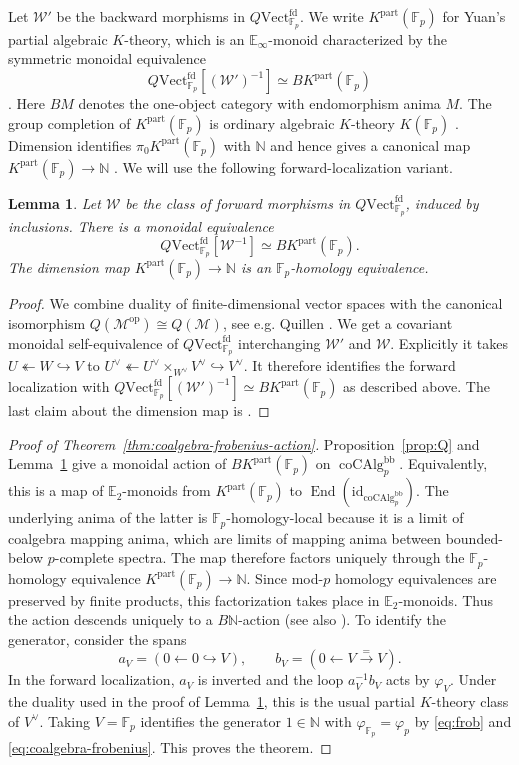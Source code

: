 \documentclass[11pt,a4paper]{article}
\newtheorem{lemma}[thm]{Lemma}
\theoremstyle{definition}
\newcommand{\Fp}{\mathbb F_p}
\newcommand{\op}{\mathrm{op}}
\newcommand{\coAlg}{\operatorname{coCAlg}}
\newcommand{\End}{\operatorname{End}}
\newcommand{\id}{\mathrm{id}}
\newcommand{\Vect}{\mathrm{Vect}^{\mathrm{fd}}_{\Fp}}
\newcommand{\Kpart}{K^{\mathrm{part}}}
\begin{document}
Let $\mathcal W'$ be the backward morphisms in $Q\Vect$.
We write $\Kpart(\Fp)$ for Yuan's partial algebraic
$K$-theory, which is an $\mathbb{E}_\infty$-monoid characterized by the symmetric monoidal equivalence
\[
 Q\Vect[(\mathcal W')^{-1}]\simeq B\Kpart(\Fp)
\]
\cite[Theorem~4.14 and Corollary~4.23.1]{Yuan}.
Here $BM$ denotes the one-object category with endomorphism
anima $M$.
The group completion of $\Kpart(\Fp)$ is ordinary algebraic $K$-theory
$K(\Fp)$ \cite[Corollary~4.9.2]{Yuan}.
Dimension identifies $\pi_0\Kpart(\Fp)$ with $\mathbb N$ and hence
gives a canonical map $\Kpart(\Fp)\to\mathbb N$
\cite[Proposition~4.10]{Yuan}.
We will use the following forward-localization variant.

\begin{lemma}\label{lem:forward-localization}
Let $\mathcal W$ be the class of forward morphisms in $Q\Vect$, induced by inclusions. There is a
monoidal equivalence
\[
 Q\Vect[\mathcal W^{-1}]\simeq B\Kpart(\Fp).
\]
The dimension map $\Kpart(\Fp)\to\mathbb N$ is an
$\Fp$-homology equivalence.
\end{lemma}
\begin{proof}
We combine
duality of finite-dimensional vector spaces with
the canonical isomorphism $Q(\mathcal M^{\op})\cong Q(\mathcal M)$, see e.g. Quillen
\cite[\S2, equation~(5)]{Quillen}. We get 
a covariant monoidal self-equivalence of $Q\Vect$
interchanging $\mathcal W'$ and $\mathcal W$.
Explicitly it takes
$U\twoheadleftarrow W\hookrightarrow V$ to
$U^\vee\twoheadleftarrow U^\vee\times_{W^\vee}V^\vee\hookrightarrow V^\vee$.
It therefore identifies the forward localization with
$Q\Vect[(\mathcal W')^{-1}] \simeq B\Kpart(\Fp)$ as described above.
The last claim about the dimension map is \cite[Theorem~5.2]{Yuan}.
\end{proof}

\begin{proof}[Proof of Theorem~\ref{thm:coalgebra-frobenius-action}]
Proposition~\ref{prop:Q} and Lemma~\ref{lem:forward-localization}
give a monoidal action of $B\Kpart(\Fp)$ on $\coAlg_p^{\mathrm{bb}}$.
Equivalently, this is a map of $\mathbb{E}_2$-monoids from
$\Kpart(\Fp)$ to $\End(\id_{\coAlg_p^{\mathrm{bb}}})$.
The underlying anima of the latter is $\Fp$-homology-local because
it is a limit of coalgebra mapping anima, which are limits of
mapping anima between bounded-below $p$-complete spectra.
The map therefore factors uniquely through the $\Fp$-homology
equivalence $\Kpart(\Fp)\to\mathbb N$.
Since mod-$p$ homology equivalences are preserved by finite products,
this factorization takes place in $\mathbb{E}_2$-monoids.
Thus the action descends uniquely to a $B\mathbb N$-action
(see also \cite[\S6.2]{Yuan}). 
To identify the generator, consider the spans
\[
 a_V=(0\leftarrow0\hookrightarrow V),\qquad
 b_V=(0\leftarrow V\xrightarrow{=}V).
\]
In the forward localization, $a_V$ is inverted and the loop
$a_V^{-1}b_V$ acts by $\varphi_V$. Under the duality used in the proof of
Lemma~\ref{lem:forward-localization}, this is the usual partial
$K$-theory class of $V^\vee$.
Taking $V=\Fp$ identifies the generator $1\in\mathbb N$ with
$\varphi_{\Fp}=\varphi_p$ by \eqref{eq:frob} and
\eqref{eq:coalgebra-frobenius}. This proves the theorem.
\end{proof}
\end{document}
